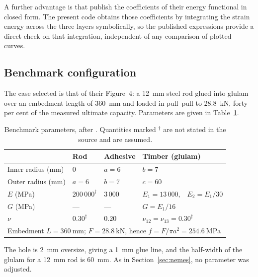 A further advantage is that
\textcite{hassaniehGluedinrodTimberJoints2018} publish the coefficients of their
energy functional in closed form. The present code obtains those coefficients
by integrating the strain energy across the three layers symbolically,
so the published expressions provide a direct check on that integration,
independent of any comparison of plotted curves.
 
\subsection{Benchmark configuration}
\label{sec:hasscase}
 
The case selected is that of their Figure~4: a \SI{12}{\milli\metre} steel rod
glued into glulam over an embedment length of \SI{360}{\milli\metre} and
loaded in pull--pull to \SI{28.8}{\kilo\newton}, forty per cent of the
measured ultimate capacity. Parameters are given in
Table~\ref{tab:hassparams}.
 
\begin{table}[htbp]
\centering
\caption{Benchmark parameters, after
         \textcite{hassaniehGluedinrodTimberJoints2018}. Quantities marked
         $^{\dagger}$ are not stated in the source and are assumed.}
\label{tab:hassparams}
\begin{tabular}{llll}
\hline
 & Rod & Adhesive & Timber (glulam) \\
\hline
Inner radius (mm)   & $0$          & $a = 6$    & $b = 7$ \\
Outer radius (mm)   & $a = 6$      & $b = 7$    & $c = 60$ \\
$E$ (MPa)           & $200\,000^{\dagger}$ & $3\,000$ & $E_1 = 13\,000$,\ \ $E_2 = E_1/30$ \\
$G$ (MPa)           & ---          & ---        & $G = E_1/16$ \\
$\nu$               & $0.30^{\dagger}$ & $0.20$ & $\nu_{12} = \nu_{13} = 0.30^{\dagger}$ \\
\hline
\multicolumn{4}{l}{Embedment $L = \SI{360}{\milli\metre}$;\quad
                   $F = \SI{28.8}{\kilo\newton}$, hence
                   $f = F/\pi a^2 = \SI{254.6}{\mega\pascal}$} \\
\hline
\end{tabular}
\end{table}
 
The hole is \SI{2}{\milli\metre} oversize, giving a \SI{1}{\milli\metre} glue
line, and the half-width of the glulam for a \SI{12}{\milli\metre} rod is
\SI{60}{\milli\metre}. As in Section~\ref{sec:nemes}, no parameter was
adjusted.
 
